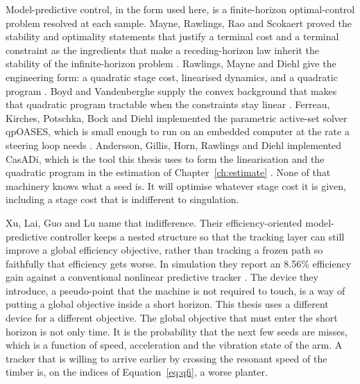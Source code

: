 Model-predictive control, in the form used here, is a finite-horizon optimal-control problem resolved at each sample. Mayne, Rawlings, Rao and Scokaert proved the stability and optimality statements that justify a terminal cost and a terminal constraint as the ingredients that make a receding-horizon law inherit the stability of the infinite-horizon problem \cite{mayne2000}. Rawlings, Mayne and Diehl give the engineering form: a quadratic stage cost, linearised dynamics, and a quadratic program \cite{rawlings2017}. Boyd and Vandenberghe supply the convex background that makes that quadratic program tractable when the constraints stay linear \cite{boyd2004}. Ferreau, Kirches, Potschka, Bock and Diehl implemented the parametric active-set solver qpOASES, which is small enough to run on an embedded computer at the rate a steering loop needs \cite{ferreau2014}. Andersson, Gillis, Horn, Rawlings and Diehl implemented CasADi, which is the tool this thesis uses to form the linearisation and the quadratic program in the estimation of Chapter~\ref{ch:estimate} \cite{andersson2019}. None of that machinery knows what a seed is. It will optimise whatever stage cost it is given, including a stage cost that is indifferent to singulation.

Xu, Lai, Guo and Lu name that indifference. Their efficiency-oriented model-predictive controller keeps a nested structure so that the tracking layer can still improve a global efficiency objective, rather than tracking a frozen path so faithfully that efficiency gets worse. In simulation they report an \num{8.56}\% efficiency gain against a conventional nonlinear predictive tracker \cite{xu2022}. The device they introduce, a pseudo-point that the machine is not required to touch, is a way of putting a global objective inside a short horizon. This thesis uses a different device for a different objective. The global objective that must enter the short horizon is not only time. It is the probability that the next few seeds are misses, which is a function of speed, acceleration and the vibration state of the arm. A tracker that is willing to arrive earlier by crossing the resonant speed of the timber is, on the indices of Equation~\eqref{eq:qfi}, a worse planter.

